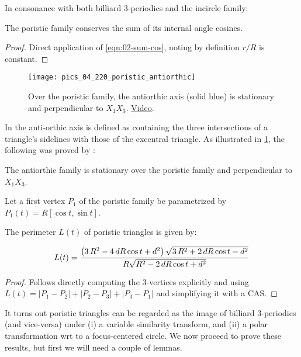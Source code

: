 In consonance with both billiard 3-periodics and the incircle family:

\begin{proposition}
The poristic family conserves the sum of its internal angle cosines.
\end{proposition}

\begin{proof}
Direct application of \cref{eqn:02-sum-cos}, noting by definition $r/R$ is constant.
\end{proof}

\begin{figure}
    \centering
    \texttt{[image: pics\_04\_220\_poristic\_antiorthic]}
    \caption{Over the poristic family, the antiorthic axis (solid blue) is stationary and perpendicular to $X_1 X_3$. \href{https://youtu.be/DS4ryndDK6Q}{Video}.}
    \label{fig:04-antiorthic}
\end{figure}

In \cite[Antiorthic axis]{mw} the anti-orthic axis is defined as containing the three intersections of a triangle's sidelines with those of the excentral triangle. As illustrated in \cref{fig:04-antiorthic}, the following was proved by \cite{weaver1927-poristic}:

\begin{proposition}
The antiorthic family is stationary over the poristic family and perpendicular to $X_1 X_3$.
\label{prop:04-antiorthic}
\end{proposition}

Let a first vertex $P_1$ of the poristic family be parametrized by $P_1(t)=R[\cos{t},\sin{t}]$.

\begin{proposition}
The perimeter $L(t)$ of poristic triangles is given by:

\begin{equation*}
L(t)=\frac {\left(3\,{R}^{2}
-4\,dR\cos t  +{d}^{2} \right)\sqrt{3\,{R}^{2}+2\,dR\cos t  -{d}^{2}}  }{R\sqrt {{R}^{2}-2\,dR
\cos t  +{d}^{2}}}\\
\end{equation*}
\end{proposition}
\begin{proof}
Follows directly computing the 3-vertices explicitly and using $L(t)=|P_1-P_2|+|P_2-P_3|+|P_3-P_1|$ and simplifying it with a CAS.  
\end{proof}

It turns out poristic triangles can be regarded as the image of billiard 3-periodics (and vice-versa) under (i) a variable similarity transform, and (ii) a polar transformation wrt to a focus-centered circle. We now proceed to prove these results, but first we will need a couple of lemmas.

